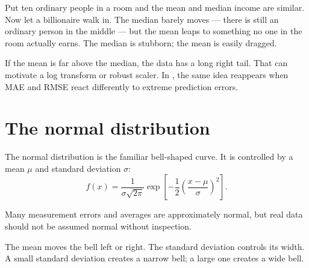 \begin{analogy}
Put ten ordinary people in a room and the mean and median income are similar. Now let a billionaire walk in. The median barely moves --- there is still an ordinary person in the middle --- but the mean leaps to something no one in the room actually earns. The median is stubborn; the mean is easily dragged.
\end{analogy}

\begin{keyidea}
If the mean is far above the median, the data has a long right tail. That can motivate a log transform or robust scaler. In , the same idea reappears when MAE and RMSE react differently to extreme prediction errors.
\end{keyidea}

\section{The normal distribution}

The normal distribution is the familiar bell-shaped curve. It is controlled by a mean $\mu$ and standard deviation $\sigma$:
\[
  f(x)=\frac{1}{\sigma\sqrt{2\pi}}
  \exp\!\left[-\frac{1}{2}\left(\frac{x-\mu}{\sigma}\right)^2\right].
\]

\begin{mlfigure}
\end{mlfigure}

Many measurement errors and averages are approximately normal, but real data should not be assumed normal without inspection.

\begin{intuition}
The mean moves the bell left or right. The standard deviation controls its width. A small standard deviation creates a narrow bell; a large one creates a wide bell.
\end{intuition}

